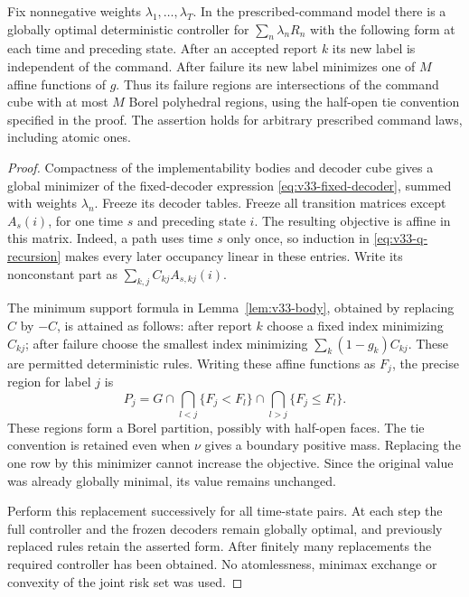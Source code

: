 \begin{theorem}\label{thm:v33-polyhedral}
Fix nonnegative weights $\lambda_1,\ldots,\lambda_T$. In the
prescribed-command model there is a globally optimal deterministic
controller for $\sum_n\lambda_n R_n$ with the following form at each
time and preceding state. After an accepted report $k$ its new label
is independent of the command. After failure its new label minimizes
one of $M$ affine functions of $g$. Thus its failure regions are intersections of the command cube with
at most $M$ Borel polyhedral regions, using the half-open tie
convention specified in the proof.
The assertion holds for arbitrary prescribed command laws, including
atomic ones.
\end{theorem}
\begin{proof}
Compactness of the implementability bodies and decoder cube gives a
global minimizer of the fixed-decoder expression
\eqref{eq:v33-fixed-decoder}, summed with weights $\lambda_n$.
Freeze its decoder tables. Freeze all transition matrices except
$A_s(i)$, for one time $s$ and preceding state $i$. The resulting
objective is affine in this matrix. Indeed, a path uses time $s$
only once, so induction in \eqref{eq:v33-q-recursion} makes every
later occupancy linear in these entries. Write its nonconstant part
as $\sum_{k,j}C_{kj}A_{s,kj}(i)$.

The minimum support formula in Lemma~\ref{lem:v33-body}, obtained
by replacing $C$ by $-C$, is attained as follows: after report $k$
choose a fixed index minimizing $C_{kj}$; after failure choose the
smallest index minimizing $\sum_k(1-g_k)C_{kj}$. These are permitted
deterministic rules. Writing these affine functions as $F_j$, the precise region for
label $j$ is
\begin{equation}\label{eq:v34-ties}
 P_j=G\cap\bigcap_{l<j}\{F_j<F_l\}
         \cap\bigcap_{l>j}\{F_j\le F_l\}.
\end{equation}
These regions form a Borel partition, possibly with half-open faces.
The tie convention is retained even when $\nu$ gives a boundary
positive mass. Replacing the one row by this
minimizer cannot increase the objective. Since the original value
was already globally minimal, its value remains unchanged.

Perform this replacement successively for all time-state pairs.
At each step the full controller and the frozen decoders remain
globally optimal, and previously replaced rules retain the asserted
form. After finitely many replacements the required controller has
been obtained. No atomlessness, minimax exchange or convexity of the
joint risk set was used.
\end{proof}

